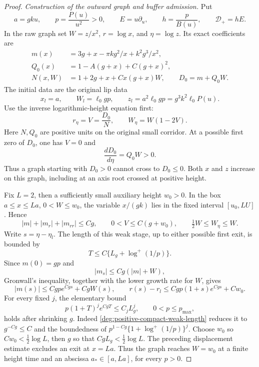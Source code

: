 \begin{proof}
\smallskip
\noindent\emph{Construction of the outward graph and buffer admission.}
Put
\[
 a=gku,\qquad p=\frac{P(u)}{u^2}>0,\qquad
 E=u\partial_u,\qquad h=\frac p{B(u)},\qquad \mathcal D_+=hE.
\]
In the raw graph set \(W=z/x^2\), \(r=\log x\), and \(\eta=\log z\).
Its exact coefficients are
\[
 \begin{split}
 m(x)&=3g+x-\pi kg^2/x+k^2g^3/x^2,\\
 Q_0(x)&=1-A(g+x)+C(g+x)^2,\\
 N(x,W)&=1+2g+x+Cx(g+x)W,\qquad D_0=m+Q_0W.
 \end{split}
\]
The initial data are the original lip data
\begin{equation}
 x_l=a,\qquad W_l=\ell_0gp,\qquad
 z_l=a^2\ell_0gp=g^3k^2\ell_0P(u).
 \label{deg:positive-compact-raw-initial}
\end{equation}
Use the inverse logarithmic-height equation first:
\begin{equation}
 r_\eta=V=\frac{D_0}N,\qquad W_\eta=W(1-2V).
 \label{deg:positive-compact-inverse-height}
\end{equation}
Here \(N,Q_0\) are positive units on the original small corridor.
At a possible first zero of \(D_0\), one has \(V=0\) and
\[
 \frac{dD_0}{d\eta}=Q_0W>0.
\]
Thus a graph starting with \(D_0>0\) cannot cross to \(D_0\le0\).
Both \(x\) and \(z\) increase on this graph, including at an axis
root crossed at positive height.

Fix \(L=2\), then a sufficiently small auxiliary height \(w_0>0\).
In the box \(a\le x\le La\), \(0<W\le w_0\), the variable
\(x/(gk)\) lies in the fixed interval \([u_0,LU]\). Hence
\[
 |m|+|m_r|+|m_{rr}|\le Cg,\qquad
 0<V\le C(g+w_0),\qquad \tfrac12W\le W_\eta\le W.
\]
Write \(s=\eta-\eta_l\). The length of this weak stage, up to either
possible first exit, is bounded by
\begin{equation}
 T\le C\{L_g+\log^+(1/p)\}.
 \label{deg:positive-compact-weak-length}
\end{equation}
Since \(m(0)=gp\) and
\[
 |m_s|\le Cg(|m|+W),
\]
Gronwall's inequality, together with the lower growth rate for \(W\),
gives
\[
 |m(s)|\le Cgp e^{Cgs}+CgW(s),\qquad
 r(s)-r_l\le Cgp(1+s)e^{Cgs}+Cw_0.
\]
For every fixed \(j\), the elementary bound
\begin{equation}
 p(1+T)^j e^{CgT}\le C_jL_g^j,\qquad 0<p\le p_{\max},
 \label{deg:positive-compact-polynomial-absorption}
\end{equation}
holds after shrinking \(g\).
Indeed \eqref{deg:positive-compact-weak-length} reduces it to
\(g^{-Cg}\le C\) and the boundedness of
\(p^{1-Cg}\{1+\log^+(1/p)\}^j\).
Choose \(w_0\) so \(Cw_0<\frac12\log L\), then \(g\) so that
\(CgL_g<\frac12\log L\).
The preceding displacement estimate excludes an exit at \(x=La\).
Thus the graph reaches \(W=w_0\) at a finite height time and an
abscissa \(a_*\in[a,La]\), for every \(p>0\).


\end{proof}
